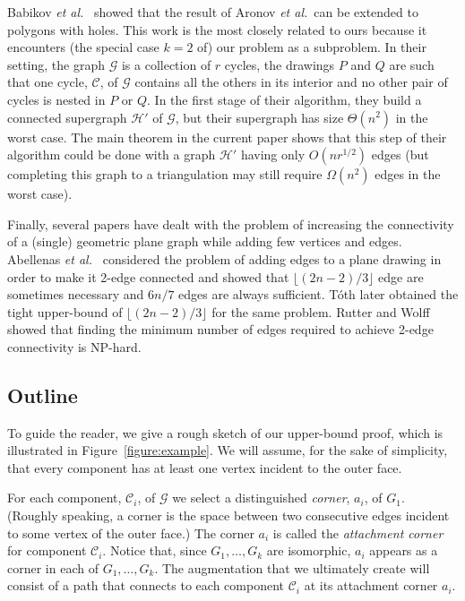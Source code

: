 \documentclass[11pt]{patmorin}
\newcommand{\etal}{\emph{et al.}}
\begin{document}
Babikov \etal\ \cite{babikov.souvaine.ea:constructing} showed that the result of Aronov \etal\ can be extended to polygons with holes. This work is the most closely related to ours because it encounters (the special case $k=2$ of) our problem as a subproblem. In their setting, the graph $\mathcal G$ is a collection of $r$ cycles, the drawings $P$ and $Q$ are such that one cycle, $\mathcal C$, of $\mathcal G$ contains all the others in its interior and no other pair of cycles is nested in $P$ or $Q$. In the first stage of their algorithm, they build a connected supergraph $\mathcal{H}'$ of $\mathcal{G}$, but their supergraph has size $\Theta(n^2)$ in the worst case.  The main theorem in the current paper shows that this step of their algorithm could be done with a graph $\mathcal{H}'$ having only $O(nr^{1/2})$ edges (but completing this graph to a triangulation may still require $\Omega(n^2)$ edges in the worst case).

Finally, several papers have dealt with the problem
of increasing the connectivity of a (single) geometric
plane graph while adding few vertices and edges.  Abellenas
\etal~\cite{abellanas.olaverri.ea:augmenting} considered the problem of
adding edges to a plane drawing in order to make it 2-edge connected
and showed that $\lfloor(2n-2)/3\rfloor$ edge are sometimes necessary
and $6n/7$ edges are always sufficient.  T\'oth \cite{toth:connectivity}
later obtained the tight upper-bound of $\lfloor(2n-2)/3\rfloor$ for
the same problem.  Rutter and Wolff \cite{rutter.wolff:augmenting} showed
that finding the minimum number of edges required to achieve 2-edge
connectivity is NP-hard.


\subsection{Outline}

To guide the reader, we give a rough sketch of our upper-bound proof,
which is illustrated in Figure~\ref{figure:example}.  We will assume,
for the sake of simplicity, that every component has at least one vertex
incident to the outer face.

For each component, $\mathcal C_i$, of $\mathcal G$ we select
a distinguished \emph{corner}, $a_i$, of $G_1$. (Roughly speaking, a corner is the
space between two consecutive edges incident to some vertex of the
outer face.) The corner $a_i$ is called the \emph{attachment corner}
for component $\mathcal C_i$.  Notice that, since $G_1,\ldots,G_k$
are isomorphic, $a_i$ appears as a corner in each of $G_1,\ldots,G_k$.
The augmentation that we ultimately create will consist of a path that
connects to each component $\mathcal C_i$ at its attachment corner $a_i$.
\end{document}
